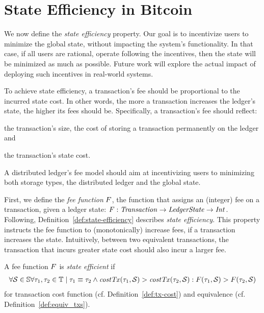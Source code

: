 \section{State Efficiency in Bitcoin}\label{sec:fee_model}

We now define the \emph{state efficiency} property. Our goal is to incentivize
users to minimize the global state, without impacting the system's
functionality. In that case, if all users are rational, \ie operate following
the incentives, then the state will be minimized as much as possible. Future
work will explore the actual impact of deploying such incentives in real-world
systems.

To achieve state efficiency, a transaction's fee should be proportional to the
incurred state cost. In other words, the more a transaction increases the
ledger's state, the higher its fees should be. Specifically, a transaction's
fee should reflect:
\begin{inparaenum}[i)]
    \item the transaction's size, \ie the cost of storing a transaction
        permanently on the ledger and
    \item the transaction's state cost.
\end{inparaenum}
A distributed ledger's fee model should aim at incentivizing users
to minimizing both storage types, \ie the distributed ledger and the global
state.

First, we define the \emph{fee function} $F$, \ie the function that
assigns an (integer) fee on a transaction, given a ledger state:
$F: \mathit{Transaction} \rightarrow \mathit{LedgerState} \rightarrow \mathit{Int}$.
Following, Definition~\ref{def:state-efficiency} describes \emph{state
efficiency}. This property instructs the fee function to (monotonically)
increase fees, if a transaction increases the state. Intuitively, between two
equivalent transactions, the transaction that incurs greater state cost should
also incur a larger fee.

\begin{definition}\label{def:state-efficiency}
    A fee function $F$ is \emph{state efficient} if
    \begin{align*}
        \forall \mathcal{S} \in \mathbb{S} \forall \tau_1, \tau_2 \in \mathbb{T} \mid \tau_1 \equiv \tau_2 \land \mathit{costTx}(\tau_1, \mathcal{S}) > \mathit{costTx}(\tau_2, \mathcal{S}):
        F(\tau_1, \mathcal{S}) > F(\tau_2, \mathcal{S})
    \end{align*}
    for transaction cost function (cf. Definition~\ref{def:tx-cost}) and
    equivalence (cf. Definition~\ref{def:equiv_txs}).
\end{definition}

